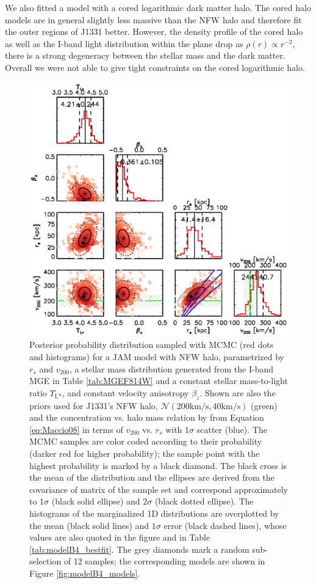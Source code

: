 We also fitted a model with a cored logarithmic dark matter halo. The cored halo models are in general slightly less massive than the NFW halo and therefore fit the outer regions of J1331 better. However, the density profile of the cored halo as well as the I-band light distribution within the plane drop as $\rho(r) \propto r^{-2}$, there is a strong degeneracy between the stellar mass and the dark matter. Overall we were not able to give tight constraints on the cored logarithmic halo.

\begin{figure}
\centering
\includegraphics[width=0.9\linewidth]{fig/B4_contour_plot_short.ps}
\caption{Posterior probability distribution sampled with MCMC (red dots and histograms) for a JAM model with NFW halo, parametrized by $r_s$ and $v_\text{200}$, a stellar mass distribution generated from the I-band MGE in Table \ref{tab:MGEF814W} and a constant stellar mass-to-light ratio $\Upsilon_\text{I,*}$, and constant velocity anisotropy $\beta_z$. Shown are also the priors used for J1331's NFW halo, $\mathscr{N}(200 \text{km/s},40 \text{km/s})$ (green) and the concentration vs. halo mass relation by \citet{Maccio08} from Equation \ref{eq:Maccio08} in terms of $v_{200}$ vs. $r_s$ with $1\sigma$ scatter (blue). The MCMC samples are color coded according to their probability (darker red for higher probability); the sample point with the highest probability is marked by a black diamond. The black cross is the mean of the distribution and the ellipses are derived from the covariance of matrix of the sample set and correspond approximately to $1\sigma$ (black solid ellipse) and $2\sigma$ (black dotted ellipse). The histograms of the marginalized 1D distributions are overplotted by the mean (black solid lines) and $1\sigma$ error (black dashed lines), whose values are also quoted in the figure and in Table \ref{tab:modelB4_bestfit}. The grey diamonds mark a random sub-selection of 12 samples; the corresponding models are shown in Figure \ref{fig:modelB4_models}.}
\label{fig:modelB4_triangle}
\end{figure}

